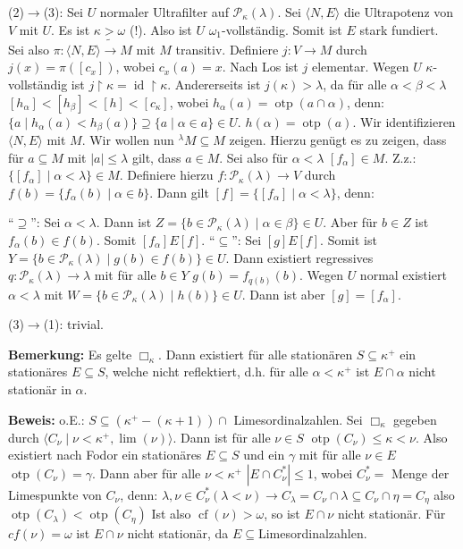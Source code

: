 \documentclass[a4paper,fontsize=11pt]{scrartcl}
\newcommand{\cf}{\operatorname{cf}}
\newcommand{\otp}{\operatorname{otp}}
\newcommand{\id}{\operatorname{id}}
\begin{document}
		(2)$\to$(3): Sei $U$ normaler Ultrafilter auf $\mathcal P_\kappa(\lambda)$.
		Sei $\langle N,E\rangle$ die Ultrapotenz von $V$ mit $U$.
		Es ist $\kappa>\omega$ (!).
		Also ist $U$ $\omega_1$-vollständig.
		Somit ist $E$ stark fundiert.
		Sei also $\pi\colon\langle N,E\rangle\tilde\to M$ mit $M$ transitiv.
		Definiere $j\colon V\to M$ durch $j(x)=\pi([c_x])$, wobei $c_x(a)=x$.
		Nach Los ist $j$ elementar. %
		Wegen $U$ $\kappa$-vollständig ist $j\upharpoonright\kappa=\id\upharpoonright\kappa$.
		Andererseits ist $j(\kappa)>\lambda$, da für alle $\alpha<\beta<\lambda$ $[h_\alpha]<[h_\beta]<[h]<[c_\kappa]$, wobei $h_\alpha(a)=\otp(a\cap\alpha)$, denn:
		$\{a\mid h_{\alpha}(a)<h_\beta(a)\}\supseteq\{a\mid \alpha\in a\}\in U$.
		$h(\alpha)=\otp(a)$.
		Wir identifizieren $\langle N,E\rangle$ mit $M$.
		Wir wollen nun $^\lambda M\subseteq M$ zeigen.
		Hierzu genügt es zu zeigen, dass für $a\subseteq M$ mit $|a|\le\lambda$ gilt, dass $a\in M$.
		Sei also für $\alpha<\lambda$ $[f_{\alpha}]\in M$.
		Z.z.: $\{[f_\alpha]\mid \alpha<\lambda\}\in M$.
		Definiere hierzu $f\colon \mathcal P_\kappa(\lambda)\to V$ durch $f(b)=\{f_\alpha(b)\mid \alpha\in b\}$.
		Dann gilt $[f]=\{[f_\alpha]\mid\alpha<\lambda\}$, denn:

		``$\supseteq$'': Sei $\alpha<\lambda$.
		Dann ist $Z=\{b\in \mathcal P_{\kappa}(\lambda)\mid \alpha\in\beta\}\in U$.
		Aber für $b\in Z$ ist $f_\alpha(b)\in f(b)$. Somit $[f_\alpha]E[f]$.
		``$\subseteq$'': Sei $[g]E[f]$. Somit ist $Y=\{b\in\mathcal P_\kappa(\lambda)\mid g(b)\in f(b)\}\in U$.
		Dann existiert regressives $q\colon\mathcal P_\kappa(\lambda)\to \lambda$ mit für alle $b\in Y$ $g(b)=f_{q(b)}(b)$.
		Wegen $U$ normal existiert $\alpha<\lambda$ mit $W=\{b\in\mathcal P_\kappa(\lambda)\mid h(b)\}\in U$.
		Dann ist aber $[g]=[f_\alpha]$.
		
		(3)$\to$(1): trivial.

{\bf Bemerkung:} Es gelte $\Box_\kappa$.
	Dann existiert für alle stationären $S\subseteq\kappa^+$ ein stationäres $E\subseteq S$,
	welche nicht reflektiert, d.h. für alle $\alpha<\kappa^+$ ist $E\cap\alpha$ nicht stationär in $\alpha$.

	{\bf Beweis:} o.E.: $S\subseteq (\kappa^+-(\kappa+1))\cap$ Limesordinalzahlen.
		Sei $\Box_\kappa$ gegeben durch $\langle C_\nu\mid \nu<\kappa^+,\lim(\nu)\rangle$.
		Dann ist für alle $\nu\in S$ $\otp(C_\nu)\le \kappa<\nu$.
		Also existiert nach Fodor ein stationäres $E\subseteq S$ und ein $\gamma$ mit für alle $\nu \in E$ $\otp(C_\nu)=\gamma$.
		Dann aber für alle $\nu<\kappa^+$ $|E\cap C^*_\nu|\le 1$, wobei $C^*_\nu=$ Menge der Limespunkte von $C_\nu$, denn:
		$\lambda,\nu\in C^*_\nu (\lambda<\nu) \to C_\lambda=C_\nu\cap\lambda\subseteq C_\nu\cap\eta=C_\eta$ also $\otp(C_\lambda)<\otp(C_\eta)$
		Ist also $\cf(\nu)>\omega$, so ist $E\cap \nu$ nicht stationär.
		Für $cf(\nu)=\omega$ ist $E\cap\nu$ nicht stationär, da $E\subseteq$Limesordinalzahlen.
\end{document}

